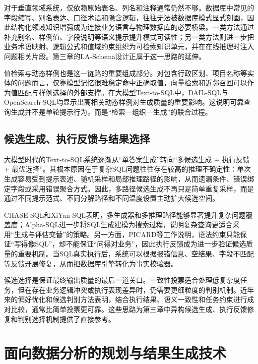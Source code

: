 对于垂直领域系统，仅依赖原始表名、列名和注释通常仍然不够。数据库中常见的字段缩写、别名表达、口径术语和隐含逻辑，往往无法被数据库模式显式刻画，因此结构化领域知识增强成为连接业务语言与物理数据库的必要桥梁。一类方法通过补充别名、样例值、字段说明等语义提示提升模式可读性；另一类方法则进一步把业务术语映射、逻辑公式和值域约束组织为可检索知识单元，并在在线推理时注入问题相关片段\cite{王昊奋2024,沈宇2025}。第三章的LA-Schema设计正属于这一思路的延伸。

值检索与动态样例也是这一链路的重要组成部分。对包含行政区划、项目名称等实体的问题而言，仅靠模型记忆很难稳定命中正确取值，向量检索和近邻召回可以作为值匹配与样例选择的外部支撑。在大模型Text-to-SQL中，DAIL-SQL与OpenSearch-SQL均显示出高相关动态样例对生成质量的重要影响\cite{gao2024text2sql,xie2025opensearch}。这说明可靠查询生成并不是单轮提示行为，而是“检索—组织—生成”的联合过程。


\subsection{候选生成、执行反馈与结果选择}

大模型时代的Text-to-SQL系统逐渐从“单答案生成”转向“多候选生成 + 执行反馈 + 最优选择”。其根本原因在于复杂SQL问题往往存在较高的推理不确定性：单次生成容易受到提示表述、随机采样和局部推理路径的影响，从而遗漏条件、错误绑定字段或采用错误聚合方式。因此，多路径候选生成不再只是简单重复采样，而是通过不同提示范式、不同分解路径和不同温度设置主动扩大候选空间。

CHASE-SQL\cite{pourreza2024chase}和XiYan-SQL\cite{gao2024xiyan}表明，多生成器和多推理路径能够显著提升复杂问题覆盖度；Alpha-SQL\cite{li2025alpha}进一步将SQL生成建模为搜索过程，说明复杂查询更适合采用“生成与评估交替”的策略。另一方面，PICARD\cite{scholak2021picard}等工作说明，语法约束只能保证“写得像SQL”，却不能保证“问得对业务”，因此执行反馈成为进一步验证候选质量的重要机制。当SQL真实执行后，系统可以根据报错信息、空结果、字段不匹配等反馈开展修复，从而把数据库引擎转化为事实校验器。

候选选择是保证最终输出质量的最后一道关口。一致性投票适合处理低复杂度任务，但在存在业务逻辑冲突或执行表现差异时，仍需要更细粒度的判别机制。近年来的偏好优化和候选判别方法表明，结合执行结果、语义一致性和任务约束进行成对比较，通常比简单投票更可靠\cite{pourreza2024chase,gao2024xiyan}。这些思路为第三章中异构候选生成、执行反馈修复和判别选择机制提供了直接参考。

\section{面向数据分析的规划与结果生成技术}

